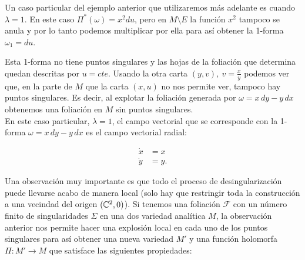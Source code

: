 



Un caso particular del ejemplo anterior que utilizaremos más adelante es cuando $\lambda=1$. En este caso $\Pi^{*}(\omega)=x^{2}du$, pero en $M\setminus E$ la función $x^{2}$ tampoco se anula y por lo tanto podemos multiplicar por ella para así obtener la 1-forma $\omega_{1}=du$.

Esta 1-forma no tiene puntos singulares y las hojas de la foliación que determina quedan descritas por $u=cte$. Usando la otra carta $(y,v),\ v=\tfrac{x}{y}$ podemos ver que, en la parte de $M$ que la carta $(x,u)$ no nos permite ver, tampoco hay puntos singulares. Es decir, al explotar la foliación generada por $\omega=x\, dy-y\, dx$ obtenemos una foliación en $M$ sin puntos singulares.\\

En este caso particular, $\lambda=1$, el campo vectorial que se corresponde con la 1-forma $\omega=x\, dy-y\, dx$ es el campo vectorial radial:

\begin{equation}
\begin{aligned}
\dot{x}&=x\\
\dot{y}&=y.
\end{aligned}
\end{equation}

Una observación muy importante es que todo el proceso de desingularización puede llevarse acabo de manera local (solo hay que restringir toda la construcción a una vecindad del origen $(\mathbb{C}^{2},0)$). Si tenemos una foliación $\mathcal{F}$ con un número finito de singularidades $\Sigma$ en una dos variedad analítica $M$, la observación anterior nos permite hacer una explosión local en cada uno de los puntos singulares para así obtener una nueva variedad $M'$ y una función holomorfa $\Pi\colon M' \rightarrow M$ que satisface las siguientes propiedades:

